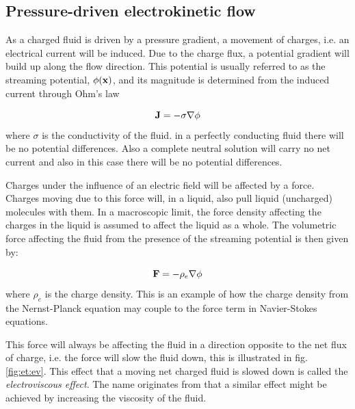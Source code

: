 \subsection{Pressure-driven electrokinetic flow}\label{sec:et:streaming_pot}
As a charged fluid is driven by a pressure gradient, a movement of
charges, i.e. an electrical current will be induced. Due to the charge
flux, a potential gradient will build up along the flow
direction. This potential is usually referred to as the streaming
potential, $\phi(\mathbf{x})$, and its magnitude is determined from the
induced current through Ohm's law

\begin{equation}
\mathbf{J} = -  \sigma \nabla \phi  
\end{equation}   
where $\sigma$ is the conductivity of the fluid. in a perfectly
conducting fluid there will be no potential differences. Also a
complete neutral solution will carry no net current and also in this
case there will be no potential differences.

Charges under the influence of an electric field will be affected by a
force. Charges moving due to this force will, in a liquid, also pull
liquid (uncharged) molecules with them. In a macroscopic limit, the
force density affecting the charges in the liquid is assumed to affect
the liquid as a whole. The volumetric force affecting the fluid from
the presence of the streaming potential is then given by:

\begin{equation}
\mathbf{F} = - \rho_e \nabla \phi
\end{equation}
where $\rho_e$ is the charge density. This is an example of how the
charge density from the Nernst-Planck equation may couple to the force
term in Navier-Stokes equations. 

This force will always be affecting the fluid in a direction opposite
to the net flux of charge, i.e. the force will slow the fluid down,
this is illustrated in fig. \ref{fig:et:ev}. This effect that a moving
net charged fluid is slowed down is called the \emph{electroviscous
  effect}. The name originates from that a similar effect might be
achieved by increasing the viscosity of the fluid.

